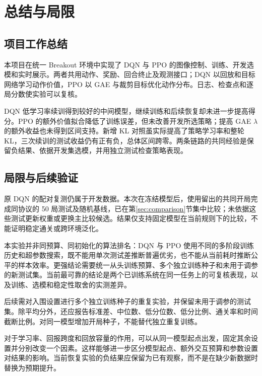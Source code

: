\section{总结与局限}
\label{sec:conclusion}
\subsection{项目工作总结}
本项目在统一 Breakout 环境中实现了 DQN 与 PPO 的图像控制、训练、开发选模和实时展示。两者共用动作、奖励、回合终止及观测接口；DQN 以回放和目标网络学习动作价值，PPO 以 GAE 与裁剪目标优化动作分布。日志、检查点和逐局分数使实验可以复核。

DQN 低学习率续训得到较好的中间模型，继续训练和后续恢复却未进一步提高得分。PPO 的额外价值拟合降低了训练误差，但未改善开发所选策略；提高 GAE $\lambda$ 的额外收益也未得到区间支持。新增 KL 对照虽实际提高了策略学习率和整轮 KL，三次续训的测试收益仍有正有负，总体区间跨零。两条链路的共同经验是保留负结果、依据开发集选模，并用独立测试检查策略表现。

\subsection{局限与后续验证}
原 DQN 的配对复测仍属于开发数据。本次在冻结模型后，使用留出的共同开局完成同协议的 50 局测试及随机基线，已在第\ref{sec:comparison}节集中比较；未依据这些测试更新权重或更换主比较候选。结果仅支持固定模型在当前规则下的比较，不能证明稳定通关或跨环境泛化。

本实验并非同预算、同初始化的算法排名：DQN 与 PPO 使用不同的多阶段训练历史和超参数搜索，既不能用单次测试差推断普遍优劣，也不能从当前耗时推断公平的样本效率。更强结论需要统一从头训练预算、多个独立训练种子和未用于调参的新测试集。当前最可靠的结论是两个已训练系统在同一任务上的可复核表现，以及训练、选模和稳定性取舍的实测差异。

后续需对入围设置进行多个独立训练种子的重复实验，并保留未用于调参的测试集。除平均分外，还应报告标准差、中位数、低分位数、低分比例、通关率和时间截断比例。对同一模型增加开局种子，不能替代独立重复训练。

对于学习率、回报跨度和回放容量的作用，可以从同一模型起点出发，固定其余设置并分别改变一个因素。这样能够进一步区分模型起点、额外交互预算和参数设置对结果的影响。当前恢复实验的负结果应保留为已有观察，而不是在缺少新数据时替换为预期提升。

\FloatBarrier
